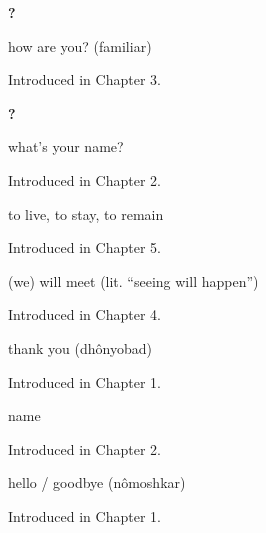 \noindent\begin{minipage}[t]{\linewidth}
\raggedright
\textbf{  ?}\par
\small how are you? (familiar)\par
\footnotesize Introduced in Chapter 3.
\end{minipage}\par\medskip

\noindent\begin{minipage}[t]{\linewidth}
\raggedright
\textbf{  ?}\par
\small what's your name?\par
\footnotesize Introduced in Chapter 2.
\end{minipage}\par\medskip

\noindent\begin{minipage}[t]{\linewidth}
\raggedright
\textbf{}\par
\small to live, to stay, to remain\par
\footnotesize Introduced in Chapter 5.
\end{minipage}\par\medskip

\noindent\begin{minipage}[t]{\linewidth}
\raggedright
\textbf{ }\par
\small (we) will meet (lit. \textquotedblleft{}seeing will happen\textquotedblright{})\par
\footnotesize Introduced in Chapter 4.
\end{minipage}\par\medskip

\noindent\begin{minipage}[t]{\linewidth}
\raggedright
\textbf{}\par
\small thank you (dhônyobad)\par
\footnotesize Introduced in Chapter 1.
\end{minipage}\par\medskip

\noindent\begin{minipage}[t]{\linewidth}
\raggedright
\textbf{}\par
\small name\par
\footnotesize Introduced in Chapter 2.
\end{minipage}\par\medskip

\noindent\begin{minipage}[t]{\linewidth}
\raggedright
\textbf{}\par
\small hello / goodbye (nômoshkar)\par
\footnotesize Introduced in Chapter 1.
\end{minipage}\par\medskip

